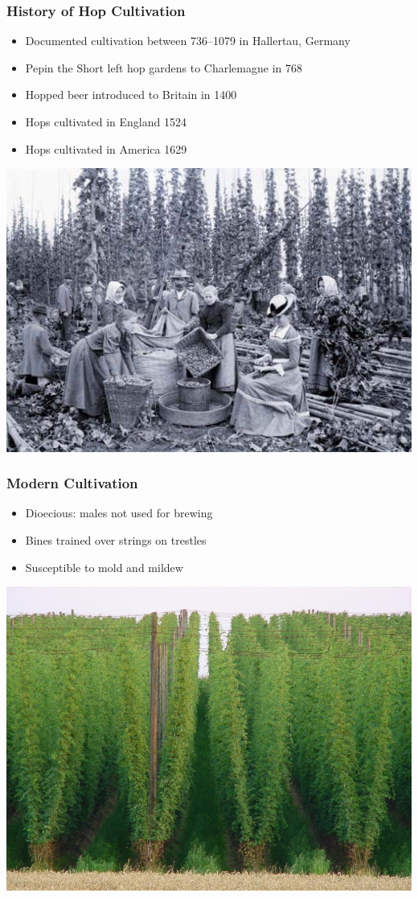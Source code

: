 \documentclass{beamer}
\begin{document}
\begin{frame}\frametitle{History of Hop Cultivation}
  \begin{itemize}
  \item Documented cultivation between 736--1079 in Hallertau, Germany
  \item Pepin the Short left hop gardens to Charlemagne in 768
  \item Hopped beer introduced to Britain in 1400
  \item Hops cultivated in England 1524
  \item Hops cultivated in America 1629
  \end{itemize}
  \centering\includegraphics[width=.5\linewidth]{./brewing/hops/bohemia}
\end{frame}

\begin{frame}\frametitle{Modern Cultivation}
  \begin{itemize}
  \item Dioecious: males not used for brewing
  \item Bines trained over strings on trestles
  \item Susceptible to mold and mildew
  \end{itemize}
  \centering  \includegraphics[width=.7\linewidth]{./brewing/hops/Hopfengarten.jpg}
\end{frame}
\end{document}
